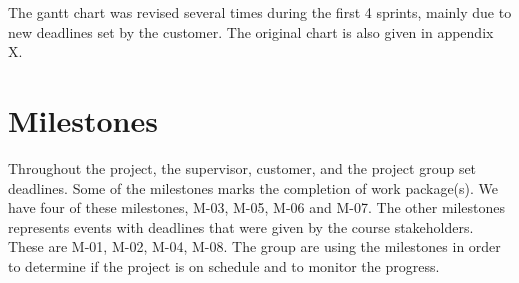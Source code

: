 The gantt chart was revised several times during the first 4 sprints,
mainly due to new deadlines set by the customer. The original chart is
also given in appendix X.

\section{Milestones}
Throughout the project, the supervisor, customer, and the project group
set deadlines.
Some of the milestones marks the completion of work package(s). We have
four of these milestones, M-03, M-05, M-06 and M-07. The other
milestones represents events with deadlines that were given by the
course stakeholders. These are M-01, M-02, M-04, M-08. The group are
using the milestones in order to determine if the project is on
schedule and to monitor the progress.

